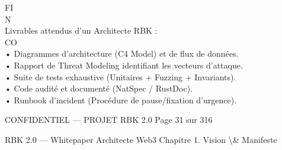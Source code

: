 \vspace{0.5em}
FI\\
N\\
Livrables attendus d’un Architecte RBK :\\
CO\\
• Diagrammes d’architecture (C4 Model) et de flux de données.\\
\vspace{0.5em}
• Rapport de Threat Modeling identifiant les vecteurs d’attaque.\\
\vspace{0.5em}
• Suite de tests exhaustive (Unitaires + Fuzzing + Invariants).\\
\vspace{0.5em}
• Code audité et documenté (NatSpec / RustDoc).\\
\vspace{0.5em}
• Runbook d’incident (Procédure de pause/fixation d’urgence).\\
\vspace{0.5em}
\vspace{0.5em}
\vspace{0.5em}
\vspace{0.5em}
\begin{confidential}CONFIDENTIEL — PROJET RBK 2.0                                Page 31 sur 316\end{confidential}
RBK 2.0 — Whitepaper Architecte Web3                                                                                        Chapitre 1. Vision \textbackslash{}& Manifeste\\
\vspace{0.5em}
\vspace{0.5em}
